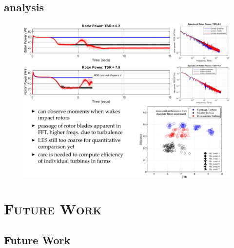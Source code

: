\documentclass[xcolor=x11names,compress]{beamer}
\begin{document}
\subsection{analysis}
	
	\begin{frame}{}
		
		\vspace{-20pt}

		\begin{figure}[p]
		    \centering
		    \includegraphics[width=1.08\textwidth]{figures/Analysis_Slide.png}
		\end{figure}

	\end{frame}

\section{\scshape Future Work}

\subsection{Future Work}
\end{document}
